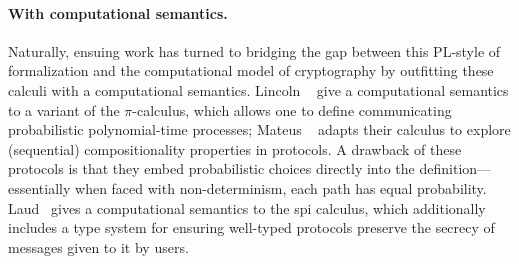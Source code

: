 \paragraph{With computational semantics.}
Naturally, ensuing work has turned to bridging the gap between this PL-style of
formalization and the computational model of cryptography by outfitting these
calculi with a computational semantics.
%
%
%
%
Lincoln \etal~\cite{lincoln1998probabilistic} give a computational semantics to
a variant of the $\pi$-calculus, which allows one to define communicating
probabilistic polynomial-time processes; Mateus
\etal~\cite{mateus2003composition} adapts their calculus to explore (sequential)
compositionality properties in protocols.
A drawback of these protocols is that they embed probabilistic choices directly
into the definition---essentially when faced with non-determinism, each path
has equal probability.
Laud~\cite{laud2005secrecy} gives a
computational semantics to the spi calculus, which additionally includes a type
system for ensuring well-typed protocols preserve the secrecy of messages given
to it by users.

